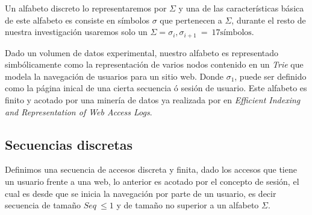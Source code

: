 Un alfabeto discreto lo representaremos por $\Sigma$ y una de las características básica de este alfabeto es consiste en símbolos $\sigma$ que pertenecen a $\Sigma$, durante el resto de nuestra investigación usaremos solo un $\Sigma = \sigma_{i},\sigma_{i+1}\ =\ 17 \mbox{símbolos}$.



Dado un volumen de datos experimental, nuestro alfabeto es representado simbólicamente como la representación de varios nodos contenido en un \emph{Trie} que modela la navegación de usuarios para un sitio web.
Donde $\sigma_{1}$, puede ser definido como la página inical de una cierta secuencia  ó sesión de usuario. Este alfabeto es finito y acotado por una minería de datos ya realizada por \cite{Claude2014} en \emph{Efficient Indexing and Representation of Web Access Logs}. %




\subsection{Secuencias discretas}

Definimos una secuencia de accesos discreta y finita, dado los accesos que tiene un usuario frente a una web, lo anterior es acotado por el concepto de sesión, el cual es desde que se inicia la navegación por parte de un usuario, es decir secuencia de tamaño $Seq\ \leq 1$ y de tamaño no superior a un alfabeto $\Sigma$.



